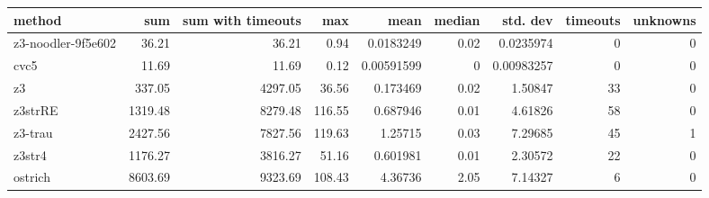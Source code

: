 \begin{tabular}{lrrrrrrrr}
\hline
 method             &     sum &   sum with timeouts &    max &       mean &   median &   std. dev &   timeouts &   unknowns \\
\hline
 z3-noodler-9f5e602 &   36.21 &               36.21 &   0.94 & 0.0183249  &     0.02 & 0.0235974  &          0 &          0 \\
 cvc5               &   11.69 &               11.69 &   0.12 & 0.00591599 &     0    & 0.00983257 &          0 &          0 \\
 z3                 &  337.05 &             4297.05 &  36.56 & 0.173469   &     0.02 & 1.50847    &         33 &          0 \\
 z3strRE            & 1319.48 &             8279.48 & 116.55 & 0.687946   &     0.01 & 4.61826    &         58 &          0 \\
 z3-trau            & 2427.56 &             7827.56 & 119.63 & 1.25715    &     0.03 & 7.29685    &         45 &          1 \\
 z3str4             & 1176.27 &             3816.27 &  51.16 & 0.601981   &     0.01 & 2.30572    &         22 &          0 \\
 ostrich            & 8603.69 &             9323.69 & 108.43 & 4.36736    &     2.05 & 7.14327    &          6 &          0 \\
\hline
\end{tabular}
